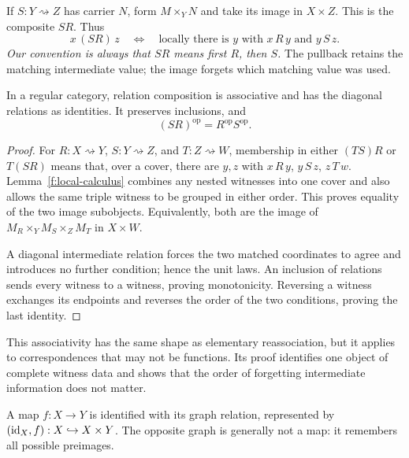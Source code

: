 If $S:Y\rightsquigarrow Z$ has carrier $N$, form $M\times_YN$ and take
its image in $X\times Z$. This is the composite $SR$. Thus
\[
x\,(SR)\,z
\quad\Longleftrightarrow\quad
\text{locally there is }y\text{ with }x\,R\,y\text{ and }y\,S\,z.
\]
\emph{Our convention is always that $SR$ means first $R$, then $S$.}
The pullback retains the matching intermediate value; the image forgets
which matching value was used.

\begin{proposition}\label{f:relation-calculus}
In a regular category, relation composition is associative and has
the diagonal relations as identities. It preserves inclusions, and
\[
(SR)^{\mathrm{op}}=R^{\mathrm{op}}S^{\mathrm{op}}.
\]
\end{proposition}
\begin{proof}
For $R:X\rightsquigarrow Y$, $S:Y\rightsquigarrow Z$, and
$T:Z\rightsquigarrow W$, membership in either $(TS)R$ or $T(SR)$
means that, over a cover, there are $y,z$ with
$x\,R\,y$, $y\,S\,z$, $z\,T\,w$. Lemma~\ref{f:local-calculus}
combines any nested witnesses into one cover and also allows the same
triple witness to be grouped in either order. This proves equality of
the two image subobjects. Equivalently, both are the image of
$M_R\times_YM_S\times_ZM_T$ in $X\times W$.

A diagonal intermediate relation forces the two matched coordinates
to agree and introduces no further condition; hence the unit laws.
An inclusion of relations sends every witness to a witness, proving
monotonicity. Reversing a witness exchanges its endpoints and reverses
the order of the two conditions, proving the last identity.
\end{proof}

This associativity has the same shape as elementary reassociation, but
it applies to correspondences that may not be functions. Its proof
identifies one object of complete witness data and shows that the order
of forgetting intermediate information does not matter.

A map $f:X\to Y$ is identified with its graph relation, represented by
$(\mathrm{id}_X,f):X\hookrightarrow X\times Y$. The opposite graph is generally
not a map: it remembers all possible preimages.

